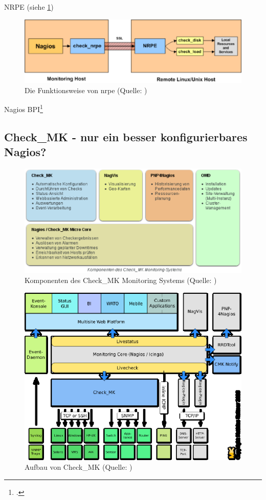\documentclass[12pt,a4paper,parskip,listof=totoc,bibliography=totoc]{scrreprt}
\begin{document}
	NRPE (siehe \ref{fig:nrpe})
	\begin{figure}[h!]
	\centering
	\includegraphics[width=1\linewidth]{pics/nrpe}
	\caption[Funktionsweise NRPE]{Die Funktionsweise von \acrlong{nrpe} (Quelle: \cite{nagioscoreaddons})}
	\label{fig:nrpe}
	\end{figure}

	
	Nagios BPI\footcite{nagiosbpi}
	
	\subsection{Check\_MK - nur ein besser konfigurierbares Nagios?}
	\begin{figure}[!h]
		\centering
		\includegraphics[width=1\textwidth]{pics/checkMKAufbau.eps}
		\caption[Komponenten des Check\_MK Monitoring Systems]{Komponenten des Check\_MK Monitoring Systems (Quelle: \cite{checkmkmonitoringpic})}
		\label{fig:checkmk}
	\end{figure}
	\begin{figure}[!h]
		\centering
		\includegraphics[width=1\textwidth]{pics/OMD_Schema.eps}
		\caption[Aufbau von Check\_MK]{Aufbau von Check\_MK (Quelle: \cite{checkmk})}
		\label{fig:checkmkaufbau}
	\end{figure}
	\clearpage
	
\end{document}
